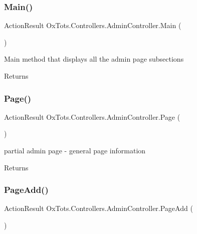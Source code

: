 \subsubsection{\texorpdfstring{Main()}{Main()}}
{\footnotesize\ttfamily Action\+Result Ox\+Tots.\+Controllers.\+Admin\+Controller.\+Main (\begin{DoxyParamCaption}{ }\end{DoxyParamCaption})\hspace{0.3cm}{\ttfamily [inline]}}



Main method that displays all the admin page subsections 

\begin{DoxyReturn}{Returns}

\end{DoxyReturn}
\mbox{\label{class_ox_tots_1_1_controllers_1_1_admin_controller_ae0bdff5f4ace8447c16e89cfd50c7f80}} 
\subsubsection{\texorpdfstring{Page()}{Page()}}
{\footnotesize\ttfamily Action\+Result Ox\+Tots.\+Controllers.\+Admin\+Controller.\+Page (\begin{DoxyParamCaption}{ }\end{DoxyParamCaption})\hspace{0.3cm}{\ttfamily [inline]}}



partial admin page -\/ general page information 

\begin{DoxyReturn}{Returns}

\end{DoxyReturn}
\mbox{\label{class_ox_tots_1_1_controllers_1_1_admin_controller_a7235fdd29f1eef059766d124082bf26b}} 
\subsubsection{\texorpdfstring{PageAdd()}{PageAdd()}\hspace{0.1cm}{\footnotesize\ttfamily [1/2]}}
{\footnotesize\ttfamily Action\+Result Ox\+Tots.\+Controllers.\+Admin\+Controller.\+Page\+Add (\begin{DoxyParamCaption}{ }\end{DoxyParamCaption})\hspace{0.3cm}{\ttfamily [inline]}}



